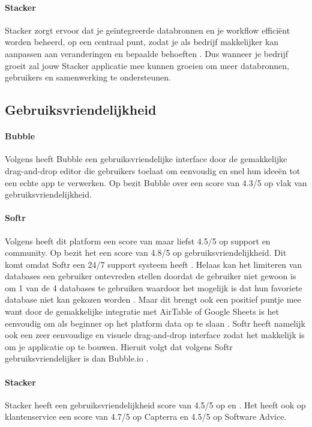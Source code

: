 \paragraph{Stacker}
Stacker zorgt ervoor dat je geïntegreerde databronnen en je workflow efficiënt worden beheerd, op een centraal punt, zodat je als bedrijf makkelijker kan aanpassen aan veranderingen en 
bepaalde behoeften \autocite{Noloco2023}. Dus wanneer je bedrijf groeit zal jouw Stacker applicatie mee kunnen groeien om meer databronnen, gebruikers en samenwerking te ondersteunen.
\subsection{Gebruiksvriendelijkheid}%
\label{subsec:gebruiksvriendelijkheid}
\paragraph{Bubble}
Volgens \textcite{Czerny2024} 
heeft Bubble een gebruiksvriendelijke interface door de gemakkelijke drag-and-drop editor die gebruikers toelaat om eenvoudig en snel hun ideeën tot een echte app te verwerken. 
Op \textcite{Capterra} bezit Bubble over een score van 4.3/5 op vlak van gebruiksvriendelijkheid.
\paragraph{Softr}
Volgens \textcite{Code2023} heeft dit platform een score van maar liefst 4.5/5 op support en community. 
Op \textcite{Capterra} bezit het een score van 4.8/5 op gebruiksvriendelijkheid.
Dit komt omdat Softr een 24/7 support systeem heeft \autocite{Youssef2023}. 
Helaas kan het limiteren van databases een gebruiker ontevreden stellen doordat de gebruiker niet gewoon is om 1 van de 4 databases te gebruiken 
waardoor het mogelijk is dat hun favoriete database niet kan gekozen worden \autocite{Frater2024}. 
Maar dit brengt ook een positief puntje mee want door de gemakkelijke integratie met AirTable of Google Sheets is het eenvoudig om als beginner op het platform data op te slaan \autocite{Code2023}. Softr heeft namelijk ook een zeer eenvoudige en visuele drag-and-drop interface zodat het makkelijk is om je applicatie op te bouwen. Hieruit volgt dat volgens \textcite{Youssef2023} Softr gebruiksvriendelijker is dan Bubble.io .
\paragraph{Stacker}
Stacker heeft een gebruiksvriendelijkheid score van 4.5/5 op \textcite{Capterra}
en \textcite{Advice}. Het heeft ook op klantenservice een score van 4.7/5 op Capterra en 4.5/5 op Software Advice.

